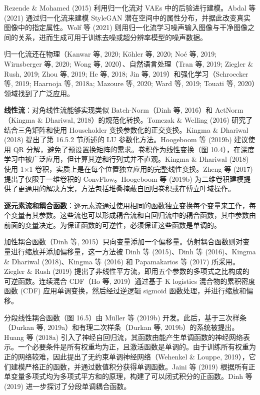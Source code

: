 Rezende \& Mohamed (2015) 利用归一化流对 VAEs 中的后验进行建模。Abdal 等 (2021) 通过归一化流来建模 StyleGAN 潜在空间中的属性分布，并据此改变真实图像中的指定属性。Wolf 等 (2021) 则用归一化流学习噪声输入图像与干净图像之间的关系，进而生成可用于训练去噪或超分辨率模型的噪声数据。

归一化流还在物理（Kanwar 等, 2020; Köhler 等, 2020; Noé 等, 2019; Wirnsberger 等, 2020; Wong 等, 2020）、自然语言处理（Tran 等, 2019; Ziegler \& Rush, 2019; Zhou 等, 2019; He 等, 2018; Jin 等, 2019）和强化学习（Schroecker 等, 2019; Haarnoja 等, 2018a; Mazoure 等, 2020; Ward 等, 2019; Touati 等, 2020）领域找到了广泛应用。

\textbf{线性流}：对角线性流能够实现类似 Batch-Norm（Dinh 等, 2016）和 ActNorm（Kingma \& Dhariwal, 2018）的规范化转换。Tomczak \& Welling (2016) 研究了结合三角矩阵和使用 Householder 变换参数化的正交变换。Kingma \& Dhariwal (2018) 提出了第 16.5.2 节所述的 LU 参数化方法。Hoogeboom 等 (2019b) 建议使用 QR 分解，避免了预设置换矩阵的需求。卷积作为线性变换（图 10.4），在深度学习中被广泛应用，但计算其逆和行列式并不直观。Kingma \& Dhariwal (2018) 使用 1×1 卷积，实质上是在每个位置独立应用的完整线性变换。Zheng 等 (2017) 提出了仅限于一维卷积的 ConvFlow。Hoogeboom 等 (2019b) 为二维卷积建模提供了更通用的解决方案，方法包括堆叠掩蔽自回归卷积或在傅立叶域操作。

\textbf{逐元素流和耦合函数}：逐元素流通过使用相同的函数独立变换每个变量来工作，每个变量有其参数。这些流也可以形成耦合流和自回归流中的耦合函数，其中参数由前面的变量决定。为保证函数的可逆性，必须保证这些函数是单调的。

加性耦合函数（Dinh 等, 2015）只向变量添加一个偏移量。仿射耦合函数则对变量进行缩放并添加偏移量，这一方法被 Dinh 等 (2015)、Dinh 等 (2016)、Kingma \& Dhariwal (2018)、Kingma 等 (2016) 和 Papamakarios 等 (2017) 所采用。Ziegler \& Rush (2019) 提出了非线性平方流，即用五个参数的多项式之比构成的可逆函数。连续混合 CDF（Ho 等, 2019）通过基于 K logistics 混合物的累积密度函数 (CDF) 应用单调变换，然后经过逆逻辑 sigmoid 函数处理，并进行缩放和偏移。

分段线性耦合函数（图 16.5）由 Müller 等 (2019b) 开发。此后，基于三次样条（Durkan 等, 2019a）和有理二次样条（Durkan 等, 2019b）的系统被提出。Huang 等 (2018a) 引入了神经自回归流，其函数由能产生单调函数的神经网络表示。一个必要条件是所有权重均为正，且激活函数是单调的。由于训练所有权重为正的网络较难，因此提出了无约束单调神经网络（Wehenkel \& Louppe, 2019），它们建模严格正的函数，并通过数值积分获得单调函数。Jaini 等 (2019) 根据所有正单变量多项式均为多项式平方和的原理，构建了可以闭式积分的正函数。Dinh 等 (2019) 进一步探讨了分段单调耦合函数。

